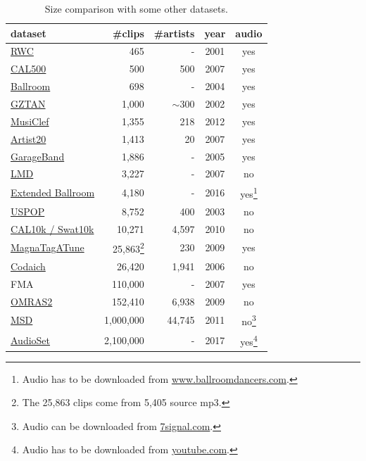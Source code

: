 \documentclass{article}
\begin{document}
\begin{table}
	\centering
	\begin{tabular}{lrrcc}
		\toprule
		dataset & \#clips & \#artists & year & audio \\
		\midrule
		\href{https://staff.aist.go.jp/m.goto/RWC-MDB/}{RWC} \cite{RWC} & 465 & - & 2001 & yes \\
		\href{http://calab1.ucsd.edu/~datasets/cal500/}{CAL500} \cite{cal500} & 500 & 500 & 2007 & yes \\
		\href{http://mtg.upf.edu/ismir2004/contest/tempoContest/node5.html}{Ballroom} \cite{ballroom} & 698 & - & 2004 & yes \\
		\href{https://marsyasweb.appspot.com/download/data_sets/}{GZTAN} \cite{gtzan} & 1,000 & $\sim300$ & 2002 & yes \\
		\href{http://www.cp.jku.at/datasets/musiclef/}{MusiClef} \cite{musiclef} & 1,355 & 218 & 2012 & yes \\
		\href{https://labrosa.ee.columbia.edu/projects/artistid/}{Artist20} \cite{artist20} & 1,413 & 20 & 2007 & yes \\  %
		\href{http://www-ai.cs.uni-dortmund.de/audio.html}{GarageBand} \cite{garageband} & 1,886 & - & 2005 & yes \\  %
		\href{http://www.ppgia.pucpr.br/~silla/lmd/}{LMD} \cite{lmd} & 3,227 & - & 2007 & no \\ %
		\href{http://anasynth.ircam.fr/home/media/ExtendedBallroom}{Extended Ballroom} \cite{extballroom} & 4,180 & - & 2016 & yes\footnote{Audio has to be downloaded from \url{www.ballroomdancers.com}.} \\
		\href{https://labrosa.ee.columbia.edu/projects/musicsim/uspop2002.html}{USPOP} \cite{uspop} & 8,752 & 400 & 2003 & no \\
		\href{http://calab1.ucsd.edu/~datasets/cal10k/}{CAL10k / Swat10k} \cite{cal10k} & 10,271 & 4,597 & 2010 & no \\
		\href{http://mirg.city.ac.uk/codeapps/the-magnatagatune-dataset}{MagnaTagATune} \cite{magnatagatune} & 25,863\footnote{The 25,863 clips come from 5,405 source mp3.} & 230 & 2009 & yes \\
		\href{http://jmir.sourceforge.net/index_Codaich.html}{Codaich} \cite{codaich} & 26,420 & 1,941 & 2006 & no \\ %
		FMA & 110,000 & - & 2007 & yes \\
		\href{http://www.omras2.org/}{OMRAS2} \cite{omras} & 152,410 & 6,938 & 2009 & no \\
		\href{https://labrosa.ee.columbia.edu/millionsong/}{MSD} \cite{msd} & 1,000,000 & 44,745 & 2011 & no\footnote{Audio can be downloaded from \url{7signal.com}.} \\
		\href{https://research.google.com/audioset/}{AudioSet} \cite{audioset} & 2,100,000 & - & 2017 & yes\footnote{Audio has to be downloaded from \url{youtube.com}.} \\
		\bottomrule
	\end{tabular}
	\caption{Size comparison with some other datasets.}
	\label{tab:size}
\end{table}
\end{document}
